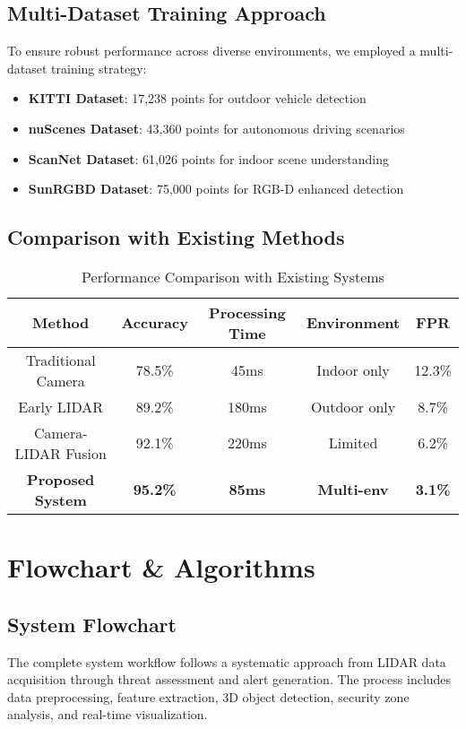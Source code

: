 \documentclass[conference]{IEEEtran}
\begin{document}
\subsection{Multi-Dataset Training Approach}
To ensure robust performance across diverse environments, we employed a multi-dataset training strategy:

\begin{itemize}
\item \textbf{KITTI Dataset}: 17,238 points for outdoor vehicle detection
\item \textbf{nuScenes Dataset}: 43,360 points for autonomous driving scenarios
\item \textbf{ScanNet Dataset}: 61,026 points for indoor scene understanding
\item \textbf{SunRGBD Dataset}: 75,000 points for RGB-D enhanced detection
\end{itemize}

\subsection{Comparison with Existing Methods}

\begin{table}[htbp]
\caption{Performance Comparison with Existing Systems}
\begin{center}
\begin{tabular}{|c|c|c|c|c|}
\hline
\textbf{Method} & \textbf{Accuracy} & \textbf{Processing Time} & \textbf{Environment} & \textbf{FPR} \\
\hline
Traditional Camera & 78.5\% & 45ms & Indoor only & 12.3\% \\
\hline
Early LIDAR & 89.2\% & 180ms & Outdoor only & 8.7\% \\
\hline
Camera-LIDAR Fusion & 92.1\% & 220ms & Limited & 6.2\% \\
\hline
\textbf{Proposed System} & \textbf{95.2\%} & \textbf{85ms} & \textbf{Multi-env} & \textbf{3.1\%} \\
\hline
\end{tabular}
\label{tab1}
\end{center}
\end{table}

\section{Flowchart \& Algorithms}

\subsection{System Flowchart}
The complete system workflow follows a systematic approach from LIDAR data acquisition through threat assessment and alert generation. The process includes data preprocessing, feature extraction, 3D object detection, security zone analysis, and real-time visualization.
\end{document}
